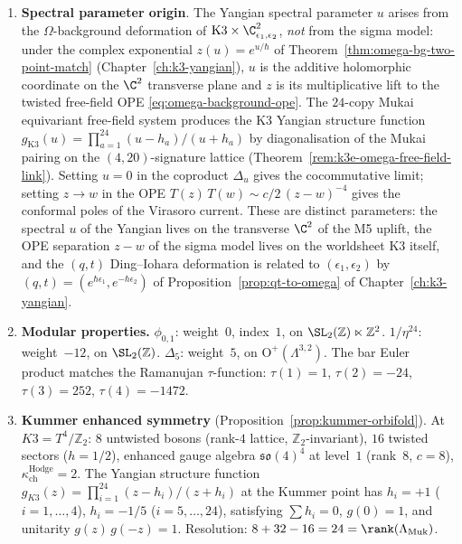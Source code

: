 \begin{enumerate}
\item \textbf{Spectral parameter origin}.
 The Yangian spectral parameter $u$ arises from the
 $\Omega$-background deformation of
 $\mathrm K3 \times \C^2_{\epsilon_1, \epsilon_2}$,
 \emph{not} from the sigma model: under the complex exponential
 $z(u) = e^{u/\hbar}$ of
 Theorem~\ref{thm:omega-bg-two-point-match}
 \textup{(}Chapter~\ref{ch:k3-yangian}\textup{),}
 $u$ is the additive holomorphic coordinate on the $\C^2$ transverse
 plane and $z$ is its multiplicative lift to the twisted free-field
 OPE \eqref{eq:omega-background-ope}.
 The $24$-copy Mukai equivariant free-field system produces the
 K3 Yangian structure function $g_{\mathrm K3}(u) = \prod_{a = 1}^{24}
 (u - h_a)/(u + h_a)$ by diagonalisation of the Mukai pairing on the
 $(4, 20)$-signature lattice
 \textup{(}Theorem~\ref{rem:k3e-omega-free-field-link}\textup{).}
 Setting $u = 0$ in the coproduct $\Delta_u$ gives the cocommutative
 limit; setting $z \to w$ in the OPE
 $T(z)\,T(w) \sim c/2\,(z - w)^{-4}$ gives the conformal poles of the
 Virasoro current. These are distinct parameters: the spectral $u$ of
 the Yangian lives on the transverse $\C^2$ of the M5 uplift, the OPE
 separation $z - w$ of the sigma model lives on the worldsheet K3
 itself, and the $(q, t)$ Ding--Iohara deformation is related to
 $(\epsilon_1, \epsilon_2)$ by
 $(q, t) = (e^{\hbar\epsilon_1}, e^{-\hbar\epsilon_2})$ of
 Proposition~\ref{prop:qt-to-omega} of Chapter~\ref{ch:k3-yangian}.

\item \textbf{Modular properties.}
 $\phi_{0,1}$: weight~$0$, index~$1$, on $\SL_2(\mathbb{Z}) \ltimes
 \mathbb{Z}^2$. $1/\eta^{24}$: weight~$-12$, on $\SL_2(\mathbb{Z})$.
 $\Delta_5$: weight~$5$, on $\mathrm{O}^+(\Lambda^{3,2})$.
 The bar Euler product matches the Ramanujan $\tau$-function:
 $\tau(1) = 1$, $\tau(2) = -24$, $\tau(3) = 252$, $\tau(4) = -1472$.

\item \textbf{Kummer enhanced symmetry} (Proposition~\ref{prop:kummer-orbifold}).
 At $K3 = T^4/\mathbb{Z}_2$: $8$ untwisted bosons (rank-$4$ lattice,
 $\mathbb{Z}_2$-invariant), $16$ twisted sectors ($h = 1/2$), enhanced
 gauge algebra $\mathfrak{so}(4)^4$ at level~$1$ (rank~$8$, $c = 8$),
 $\kappa_{\mathrm{ch}}^{\mathrm{Hodge}} = 2$. The Yangian structure function
 $g_{K3}(z) = \prod_{i=1}^{24}(z - h_i)/(z + h_i)$ at the Kummer
 point has $h_i = +1$ ($i = 1, \ldots, 4$), $h_i = -1/5$
 ($i = 5, \ldots, 24$), satisfying $\sum h_i = 0$, $g(0) = 1$,
 and unitarity $g(z)\,g(-z) = 1$. Resolution:
 $8 + 32 - 16 = 24 = \rank(\Lambda_{\mathrm{Muk}})$.


\end{enumerate}
